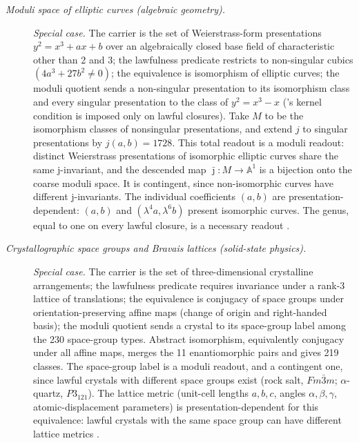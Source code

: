 \begingroup\small
\begin{description}
\item[\emph{Moduli space of elliptic curves (algebraic
geometry).}] \textit{Special case.}
The carrier is the set of Weierstrass-form presentations
\(y^2=x^3+ax+b\) over an algebraically closed base field of characteristic other
than 2 and 3; the lawfulness
predicate restricts to non-singular cubics
\((4a^3+27b^2\ne 0)\); the equivalence is isomorphism of
elliptic curves; the moduli quotient sends a
non-singular presentation to its isomorphism class and every singular
presentation to the class of \(y^2=x^3-x\) ('s kernel condition is imposed only on lawful
closures). Take \(M\) to be the isomorphism classes of
nonsingular presentations, and extend \(j\) to singular
presentations by \(j(a,b)=1728\). This total readout is a moduli readout: distinct Weierstrass
presentations of isomorphic elliptic curves share the
same j-invariant, and the descended map
\(\bar\jmath:M\to\mathbb A^1\) is a bijection onto the
coarse moduli space.  It is contingent, since non-isomorphic
curves have different j-invariants.  The individual coefficients
\((a,b)\) are presentation-dependent: \((a,b)\) and
\((\lambda^4a,\lambda^6b)\) present isomorphic curves.  The genus, equal
to one on every lawful closure, is a necessary readout
\citep{Mumford1965GIT}.

\item[\emph{Crystallographic space groups and Bravais
lattices (solid-state physics).}] \textit{Special case.}
The carrier is the set of three-dimensional crystalline
arrangements; the lawfulness
predicate requires invariance under a rank-3 lattice of
translations; the equivalence is conjugacy of space groups under
orientation-preserving affine maps (change of origin and
right-handed basis); the moduli quotient sends a crystal to its
space-group label among the 230 space-group types.  Abstract
isomorphism, equivalently conjugacy under all affine maps, merges
the 11 enantiomorphic pairs and gives 219 classes.  The space-group label is a
moduli readout, and a contingent one, since lawful crystals with different
space groups exist (rock salt, \(Fm\bar3m\); \(\alpha\)-quartz,
\(P3_121\)).  The lattice metric (unit-cell lengths
\(a,b,c\), angles \(\alpha,\beta,\gamma\),
atomic-displacement parameters) is presentation-dependent for this
equivalence: lawful crystals with the same space group can have different
lattice metrics \citep{AroyoITC2016}.


\end{description}
